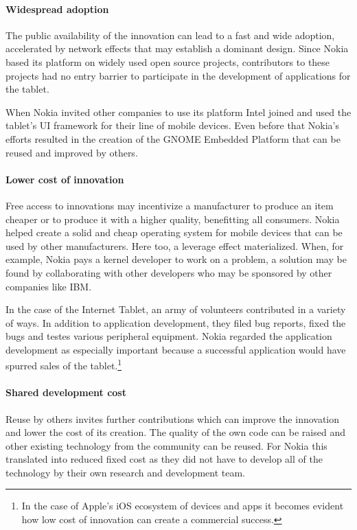 \documentclass[a4paper]{scrartcl}
\begin{document}
\paragraph{Widespread adoption}
The public availability of the innovation can lead to a fast and wide adoption, accelerated by network effects that may establish a dominant design.
Since Nokia based its platform on widely used open source projects, contributors to these projects had no entry barrier to participate in the development of applications for the tablet.

When Nokia invited other companies to use its platform Intel joined and used the tablet's UI framework for their line of mobile devices.
Even before that Nokia's efforts resulted in the creation of the GNOME Embedded Platform that can be reused and improved by others.


\paragraph{Lower cost of innovation}
Free access to innovations may incentivize a manufacturer to produce an item cheaper or to produce it with a higher quality, benefitting all consumers.
Nokia helped create a solid and cheap operating system for mobile devices that can be used by other manufacturers.
Here too, a leverage effect materialized.
When, for example, Nokia pays a kernel developer to work on a problem, a solution may be found by collaborating with other developers who may be sponsored by other companies like IBM.

In the case of the Internet Tablet, an army of volunteers contributed in a variety of ways.
In addition to application development, they filed bug reports, fixed the bugs and testes various peripheral equipment.
Nokia regarded the application development as especially important because a successful application would have spurred sales of the tablet.\footnote{In the case of Apple's iOS ecosystem of devices and apps it becomes evident how low cost of innovation can create a commercial success.}

\paragraph{Shared development cost}
Reuse by others invites further contributions which can improve the innovation and lower the cost of its creation.
The quality of the own code can be raised and other existing technology from the community can be reused.
For Nokia this translated into reduced fixed cost as they did not have to develop all of the technology by their own research and development team.
\end{document}
